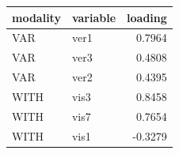 \begin{table}
\begin{tabular}{llr}
\toprule
modality & variable & loading \\
\midrule
VAR & ver1 & 0.7964 \\
VAR & ver3 & 0.4808 \\
VAR & ver2 & 0.4395 \\
WITH & vis3 & 0.8458 \\
WITH & vis7 & 0.7654 \\
WITH & vis1 & -0.3279 \\
\bottomrule
\end{tabular}
\end{table}
